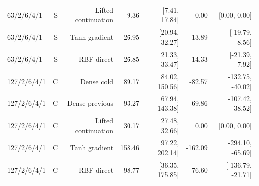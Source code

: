 \begin{table}[tbp]
\begin{tabular}{lrrrrrr}
63/2/6/4/1 & S & Lifted continuation & 9.36 & [7.41, 17.84] & 0.00 & [0.00, 0.00]\\
63/2/6/4/1 & S & Tanh gradient & 26.95 & [20.94, 32.27] & -13.89 & [-19.79, -8.56]\\
63/2/6/4/1 & S & RBF direct & 26.85 & [21.33, 33.47] & -14.33 & [-21.39, -7.92]\\
127/2/6/4/1 & C & Dense cold & 89.17 & [84.02, 150.56] & -82.57 & [-132.75, -40.02]\\
127/2/6/4/1 & C & Dense previous & 93.27 & [67.94, 143.38] & -69.86 & [-107.42, -38.52]\\
127/2/6/4/1 & C & Lifted continuation & 30.17 & [27.48, 32.66] & 0.00 & [0.00, 0.00]\\
127/2/6/4/1 & C & Tanh gradient & 158.46 & [97.22, 202.14] & -162.09 & [-294.10, -65.69]\\
127/2/6/4/1 & C & RBF direct & 98.77 & [36.35, 175.85] & -76.60 & [-136.79, -21.71]\\
\bottomrule
\end{tabular}
\end{table}

